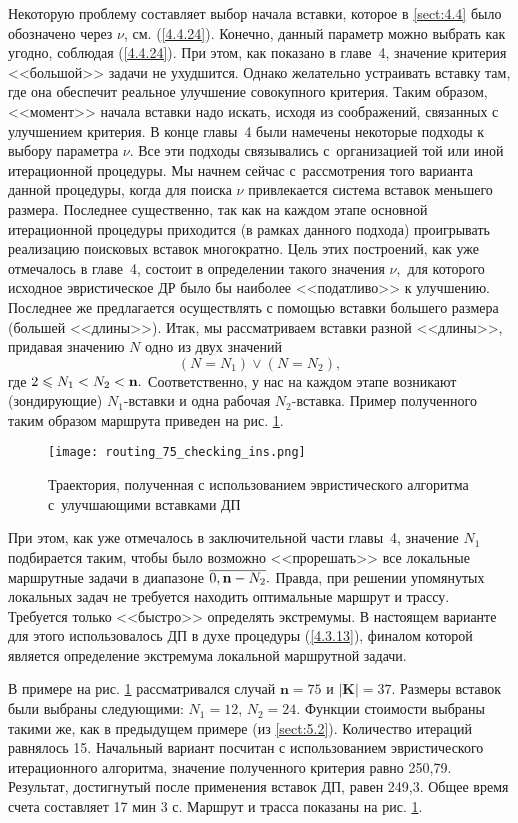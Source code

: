 Некоторую проблему составляет выбор начала вставки,
которое в \ref{sect:4.4}
было обозначено через $\nu$,
см. (\ref{4.4.24}).
Конечно, данный параметр можно выбрать как угодно,
соблюдая (\ref{4.4.24}).
При этом, как показано в
главе~4, значение критерия <<большой>> задачи не ухудшится.
Однако желательно устраивать вставку там,
где она обеспечит реальное улучшение совокупного критерия.
Таким образом, <<момент>> начала вставки надо искать,
исходя из соображений, связанных с улучшением критерия.
В конце главы~4 были намечены некоторые подходы к выбору параметра $\nu.$
Все эти подходы связывались с~организацией той или иной итерационной процедуры.
Мы начнем сейчас с~рассмотрения того варианта данной процедуры,
когда для поиска $\nu$
привлекается система вставок меньшего размера.
Последнее существенно,
так как на каждом этапе основной итерационной процедуры приходится
(в рамках данного подхода)
проигрывать реализацию поисковых вставок многократно.
Цель этих построений, как  уже отмечалось в главе~4,
состоит в определении такого значения $\nu,$
для которого исходное эвристическое ДР было бы
наиболее <<податливо>> к улучшению.
Последнее же предлагается осуществлять с помощью вставки большего размера
(большей <<длины>>).
Итак, мы рассматриваем вставки разной <<длины>>,
придавая значению $N$ одно из двух значений
$$
  (N = N_1) \vee (N=N_2)
  ,
$$
где $2 \leqslant N_1 < N_2 <{\mathbf n}.$
Соответственно, у нас на каждом этапе возникают
(зондирующие)
$N_1$-вставки и одна рабочая $N_2$-вставка.
Пример полученного таким образом маршрута приведен
на рис. \ref{DP_Inserts_Result}.

\begin{figure}[H]
  \centering
  \texttt{[image: routing\_75\_checking\_ins.png]}
  \caption{
    Траектория, полученная с использованием эвристического алгоритма
    с~улучшающими вставками ДП
    }
  \label{DP_Inserts_Result}
\end{figure}

При этом, как уже отмечалось в заключительной части главы~4,
значение
$N_1$ подбирается таким,
чтобы было возможно <<прорешать>> все локальные маршрутные задачи в диапазоне
$\ov{0,\nn-N_2}.$
Правда, при решении упомянутых
локальных задач не требуется находить оптимальные маршрут и трассу.
Требуется только <<быстро>> определять экстремумы.
В настоящем варианте для этого использовалось ДП в духе процедуры (\ref{4.3.13}),
финалом которой является определение экстремума локальной маршрутной задачи.

В примере
на рис. \ref{DP_Inserts_Result}
рассматривался случай
$\mathbf{n}=75$ и $|\mathbf{K}|=37$.
Размеры вставок были выбраны следующими:
$N_1=12$, $N_2=24$.
Функции стоимости выбраны такими же, как в предыдущем примере
(из \ref{sect:5.2}).
Количество итераций равнялось 15.
Начальный вариант посчитан с использованием эвристического итерационного алгоритма,
значение полученного критерия равно 250,79.
Результат, достигнутый после применения вставок ДП, равен 249,3.
Общее время счета составляет 17 мин 3 с.
Маршрут и трасса показаны
на рис. \ref{DP_Inserts_Result}.
